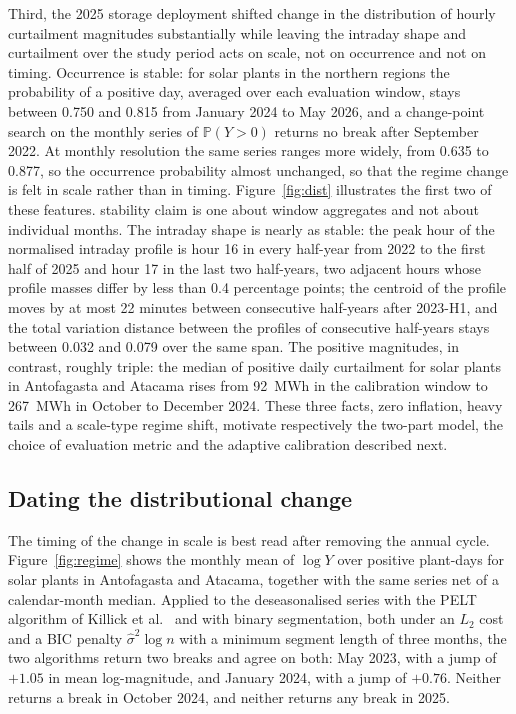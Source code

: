 \documentclass[preprint,3p,times]{elsarticle}
\providecommand{\DIFaddtex}[1]{{\protect\color{blue} \sf #1}} %
\providecommand{\DIFdeltex}[1]{{\protect\color{red} \scriptsize #1}} %
\providecommand{\DIFaddbegin}{} %
\providecommand{\DIFaddend}{} %
\providecommand{\DIFdelbegin}{} %
\providecommand{\DIFdelend}{} %
\providecommand{\DIFaddFL}[1]{\DIFadd{#1}} %
\providecommand{\DIFaddbeginFL}{} %
\providecommand{\DIFdelendFL}{} %
\providecommand{\DIFadd}[1]{\texorpdfstring{\DIFaddtex{#1}}{#1}} %
\providecommand{\DIFdel}[1]{\texorpdfstring{\DIFdeltex{#1}}{}} %
\begin{document}
\DIFaddend Third, the \DIFdelbegin \DIFdel{2025 storage deployment shifted }\DIFdelend \DIFaddbegin \DIFadd{change in }\DIFaddend the distribution of \DIFdelbegin \DIFdel{hourly curtailment magnitudes substantially while leaving the intraday shape and }\DIFdelend \DIFaddbegin \DIFadd{curtailment over the study period acts on scale, not on occurrence and not on timing. Occurrence is stable: for solar plants in the northern regions the probability of a positive day, averaged over each evaluation window, stays between 0.750 and 0.815 from January 2024 to May 2026, and a change-point search on the monthly series of $\mathbb{P}(Y>0)$ returns no break after September 2022. At monthly resolution the same series ranges more widely, from 0.635 to 0.877, so }\DIFaddend the \DIFdelbegin \DIFdel{occurrence probability almost unchanged, so that the regime change is felt in scale rather than in timing. Figure~\ref{fig:dist} illustrates the first two of these features. }\DIFdelend \DIFaddbegin \DIFadd{stability claim is one about window aggregates and not about individual months. The intraday shape is nearly as stable: the peak hour of the normalised intraday profile is hour 16 in every half-year from 2022 to the first half of 2025 and hour 17 in the last two half-years, two adjacent hours whose profile masses differ by less than 0.4 percentage points; the centroid of the profile moves by at most 22 minutes between consecutive half-years after 2023-H1, and the total variation distance between the profiles of consecutive half-years stays between 0.032 and 0.079 over the same span. The positive magnitudes, in contrast, roughly triple: the median of positive daily curtailment for solar plants in Antofagasta and Atacama rises from 92~MWh in the calibration window to 267~MWh in October to December 2024. }\DIFaddend These three facts, zero inflation, heavy tails and a scale-type \DIFdelbegin \DIFdel{regime }\DIFdelend shift, motivate respectively the two-part model, the choice of evaluation metric and the adaptive calibration described next.

\DIFdelbegin %
\DIFdelendFL \DIFaddbeginFL \subsection{Dating the distributional change}
\label{sec:regime}

\DIFaddFL{The timing of the change in scale is best read after removing the annual cycle. Figure~\ref{fig:regime} shows the monthly mean of $\log Y$ over positive plant-days for solar plants in Antofagasta and Atacama, together with the same series net of a calendar-month median. Applied to the deseasonalised series with the PELT algorithm of Killick et al.~\cite{killick2012} and with binary segmentation, both under an $L_2$ cost and a BIC penalty $\hat\sigma^2\log n$ with a minimum segment length of three months, the two algorithms return two breaks and agree on both: May 2023, with a jump of $+1.05$ in mean log-magnitude, and January 2024, with a jump of $+0.76$. Neither returns a break in October 2024, and neither returns any break in 2025.
}
\end{document}
